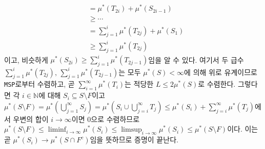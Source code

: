 \begin{enumerate}[label = \textsf{\textbf{\arabic*}}]
\begin{align*}
        &=\mu^*(T_{2i})+\mu^*(S_{2i-1})\\
        &\geq\cdots\\
        &=\sum_{j=1}^i\mu^*(T_{2j})+\mu^*(S_1)\\
        &\geq\sum_{j=1}^i\mu^*(T_{2j})
    \end{align*}
    이고, 비슷하게 $\mu^*(S_{2i})\geq\sum_{j=1}^i\mu^*(T_{2j-1})$임을 알 수 있다. 여기서 두 급수 $\sum_{j=1}^i\mu^*(T_{2j}),\,\sum_{j=1}^i\mu^*(T_{2j-1})$는 모두 $\mu^*(S)<\infty$에 의해 위로 유계이므로 \texttt{MSP}로부터 수렴하고, 곧 $\sum_{i=1}^\infty\mu^*(T_i)$는 적당한 $L\leq2\mu^*(S)$로 수렴한다. 그렇다면 각 $i\in\mathbb{N}$에 대해 $S_i\subseteq S\setminus F$이고 $\mu^*(S\setminus F)=\mu^*(\bigcup_{j=1}^\infty S_j)=\mu^*(S_i\cup\bigcup_{j=i}^\infty T_j)\leq\mu^*(S_i)+\sum_{j=i}^\infty\mu^*(T_j)$에서 우변의 합이 $i\to\infty$이면 $0$으로 수렴하므로 $\mu^*(S\setminus F)\leq\liminf_{i\to\infty}\mu^*(S_i)\leq\limsup_{i\to\infty}\mu^*(S_i)\leq\mu^*(S\setminus F)$이다. 이는 곧 $\mu^*(S_i)\to\mu^*(S\cap F^c)$임을 뜻하므로 증명이 끝난다.
    

\end{enumerate}
